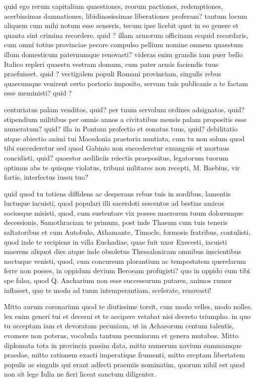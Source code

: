  quid ego rerum capitalium quaestiones, reorum pactiones, redemptiones, acerbissimas damnationes, libidinosissimas liberationes proferam? tantum locum aliquem cum mihi notum esse senseris, tecum ipse licebit quot in eo genere et quanta sint crimina recordere. quid ? illam armorum officinam ecquid recordaris, cum omni totius provinciae pecore compulso pellium nomine omnem quaestum illum domesticum paternumque renovasti? videras enim grandis iam puer bello Italico repleri quaestu vestram domum, cum pater armis faciendis tuus praefuisset. quid ? vectigalem populi Romani provinciam, singulis rebus quaecumque venirent certo portorio imposito, servam tuis publicanis a te factam esse meministi? quid ?

 centuriatus palam venditos, quid? per tuum servolum ordines adsignatos, quid? stipendium militibus per omnis annos a civitatibus mensis palam propositis esse numeratum? quid? illa in Pontum profectio et conatus tuus, quid? debilitatio atque abiectio animi tui Macedonia praetoria nuntiata, cum tu non solum quod tibi succederetur sed quod Gabinio non succederetur exsanguis et mortuus concidisti, quid? quaestor aediliciis reiectis praepositus, legatorum tuorum optimus abs te quisque violatus, tribuni militares non recepti, M. Baebius, vir fortis, interfectus iussu tuo?

 quid quod tu totiens diffidens ac desperans rebus tuis in sordibus, lamentis luctuque iacuisti, quod populari illi sacerdoti sescentos ad bestias amicos sociosque misisti, quod, cum sustentare vix posses maerorem tuum doloremque decessionis, Samothraciam te primum, post inde Thasum cum tuis teneris saltatoribus et cum Autobulo, Athamante, Timocle, formosis fratribus, contulisti, quod inde te recipiens in villa Euchadiae, quae fuit uxor Execesti, iacuisti maerens aliquot dies atque inde obsoletus Thessalonicam omnibus inscientibus noctuque venisti, quod, cum concursum plorantium ac tempestatem querelarum ferre non posses, in oppidum devium Beroeam profugisti? quo in oppido cum tibi spe falsa, quod Q. Ancharium non esse successurum putares, animos rumor inflasset, quo te modo ad tuam intemperantiam, scelerate, renovasti!

 Mitto aurum coronarium quod te diutissime torsit, cum modo velles, modo nolles. lex enim generi tui et decerni et te accipere vetabat nisi decreto triumpho. in quo tu acceptam iam et devoratam pecuniam, ut in Achaeorum centum talentis, evomere non poteras, vocabula tantum pecuniarum et genera mutabas. Mitto diplomata tota in provincia passim data, mitto numerum navium summamque praedae, mitto rationem exacti imperatique frumenti, mitto ereptam libertatem populis ac singulis qui erant adfecti praemiis nominatim, quorum nihil est quod non sit lege Iulia ne fieri liceat sanctum diligenter.

